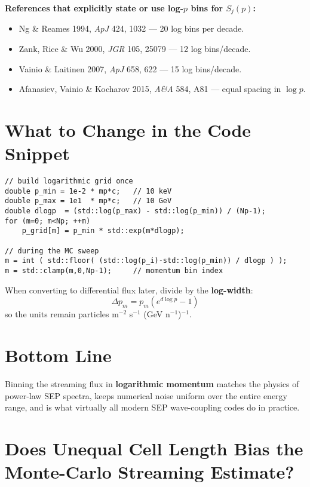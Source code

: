 \bigskip

\textbf{References that explicitly state or use log-$p$ bins for $S_j(p)$:}
\begin{itemize}
  \item Ng \& Reames 1994, \textit{ApJ} 424, 1032 — 20 log bins per decade.
  \item Zank, Rice \& Wu 2000, \textit{JGR} 105, 25079 — 12 log bins/decade.
  \item Vainio \& Laitinen 2007, \textit{ApJ} 658, 622 — 15 log bins/decade.
  \item Afanasiev, Vainio \& Kocharov 2015, \textit{A\&A} 584, A81 — equal spacing in $\log p$.
\end{itemize}

\bigskip

\section*{What to Change in the Code Snippet}

\begin{verbatim}
// build logarithmic grid once
double p_min = 1e-2 * mp*c;   // 10 keV
double p_max = 1e1  * mp*c;   // 10 GeV
double dlogp  = (std::log(p_max) - std::log(p_min)) / (Np-1);
for (m=0; m<Np; ++m)
    p_grid[m] = p_min * std::exp(m*dlogp);

// during the MC sweep
m = int ( std::floor( (std::log(p_i)-std::log(p_min)) / dlogp ) );
m = std::clamp(m,0,Np-1);     // momentum bin index
\end{verbatim}

\bigskip

When converting to differential flux later, divide by the \textbf{log-width}:
\[
\Delta p_m = p_m \left(e^{d\log p} - 1\right)
\]
so the units remain particles m$^{-2}$ s$^{-1}$ (GeV n$^{-1}$)$^{-1}$.

\bigskip

\section*{Bottom Line}

Binning the streaming flux in \textbf{logarithmic momentum} matches the physics of power-law SEP spectra, keeps numerical noise uniform over the entire energy range, and is what virtually all modern SEP wave-coupling codes do in practice.


\section*{Does Unequal Cell Length Bias the Monte-Carlo Streaming Estimate?}

